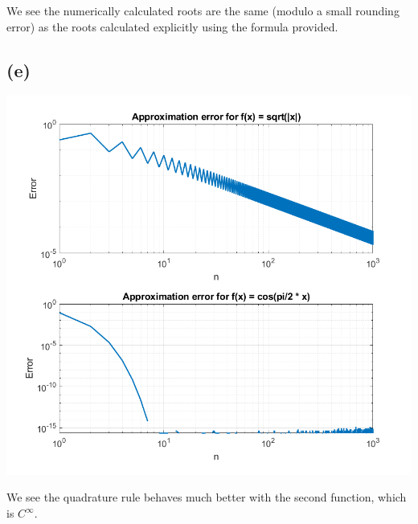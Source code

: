 \documentclass{article}
\begin{document}
We see the numerically calculated roots are the same (modulo a small rounding
error) as the roots calculated explicitly using the formula provided.

\subsection*{(e)}

\begin{center}
	\includegraphics[scale=0.6]{figure.png}
\end{center}

We see the quadrature rule behaves much better with the second function, which
is $C^\infty$.

\newpage
\end{document}
